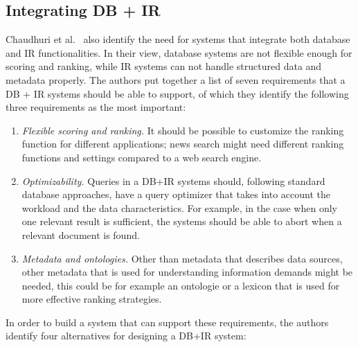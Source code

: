 \subsection{Integrating DB + IR}
Chaudhuri et al.~\cite{Chaudhuri2005IntegratingDA} also identify the need for systems that integrate both database and IR functionalities. In their view, database systems are not flexible enough for scoring and ranking, while IR systems can not handle structured data and metadata properly. The authors put together a list of seven requirements that a DB + IR systems should be able to support, of which they identify the following three requirements as the most important:
\begin{enumerate}
	\item \emph{Flexible scoring and ranking.}
	It should be possible to customize the ranking function for different applications; news search might need different ranking functions and settings compared to a web search engine. 
	\item \emph{Optimizability.}
	Queries in a DB+IR systems should, following standard database approaches, have a query optimizer that takes into account the workload and the data characteristics. For example, in the case when only one relevant result is sufficient, the systems should be able to abort when a relevant document is found. 
	\item \emph{Metadata and ontologies.}
	Other than metadata that describes data sources, other metadata that is used for understanding information demands might be needed, this could be for example an ontologie or a lexicon that is used for more effective ranking strategies.
\end{enumerate}
In order to build a system that can support these requirements, the authors identify four alternatives for designing a DB+IR system:
